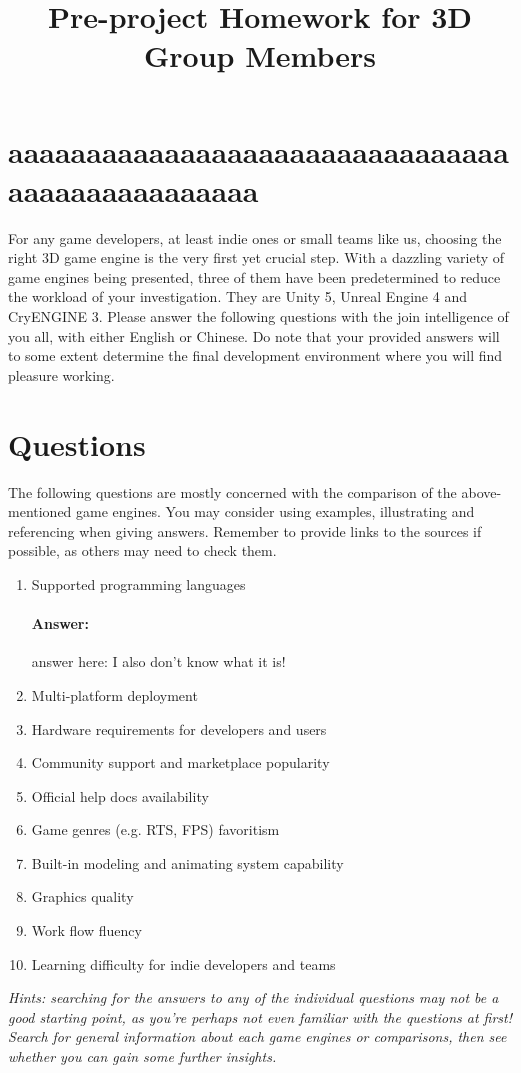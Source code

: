 \documentclass{ctexart}
\title{Pre-project Homework for 3D Group Members}
\begin{document}
	\maketitle
	\section{aaaaaaaaaaaaaaaaaaaaaaaaaaaaaaaaaaaaaaaaaaaaaaaa}
	For any game developers, at least indie ones or small teams like us, choosing the right 3D game engine is the very first yet crucial step. With a dazzling variety of game engines being presented, three of them have been predetermined to reduce the workload of your investigation. They are Unity 5, Unreal Engine 4 and CryENGINE 3. Please answer the following questions with the join intelligence of you all, with either English or Chinese. Do note that your provided answers will to some extent determine the final development environment where you will find pleasure working.
	\section{Questions}
	The following questions are mostly concerned with the comparison of the above-mentioned game engines. You may consider using examples, illustrating and referencing when giving answers. Remember to provide links to the sources if possible, as others may need to check them.
	\begin{enumerate}
		\item Supported programming languages
		\paragraph{Answer:}
		answer here:
		I also don't know what it is!
		\item Multi-platform deployment
		\item Hardware requirements for developers and users
		\item Community support and marketplace popularity
		\item Official help docs availability
		\item Game genres (e.g. RTS, FPS) favoritism
		\item Built-in modeling and animating system capability
		\item Graphics quality
		\item Work flow fluency
		\item Learning difficulty for indie developers and teams
	\end{enumerate}
	\textit{Hints: searching for the answers to any of the individual questions may not be a good starting point, as you're perhaps not even familiar with the questions at first! Search for general information about each game engines or comparisons, then see whether you can gain some further insights.}
\end{document}
